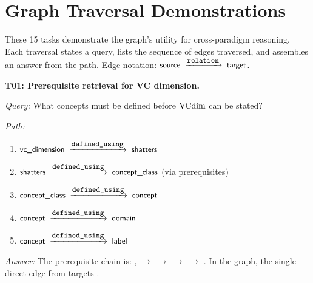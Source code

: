 \chapter{Graph Traversal Demonstrations}
\label{app:traversals}

These 15 tasks demonstrate the graph's utility for cross-paradigm reasoning.
Each traversal states a query, lists the sequence of edges traversed, and assembles an answer from the path.
Edge notation: $\edge{source}{relation}{target}$.

\begin{traversal}
\textbf{T01: Prerequisite retrieval for VC dimension.}\par\medskip
\emph{Query:} What concepts must be defined before $\mathrm{VCdim}$ can be stated?\par
\emph{Path:}\par
\begin{enumerate}[leftmargin=2em, nosep]
  \item $\edge{vc\_dimension}{defined\_using}{shatters}$
  \item $\edge{shatters}{defined\_using}{concept\_class}$ (via  prerequisites)
  \item $\edge{concept\_class}{defined\_using}{concept}$
  \item $\edge{concept}{defined\_using}{domain}$
  \item $\edge{concept}{defined\_using}{label}$
\end{enumerate}
\emph{Answer:} The prerequisite chain is: ,  $\to$  $\to$  $\to$  $\to$ . In the graph, the single direct  edge from  targets .
\end{traversal}

